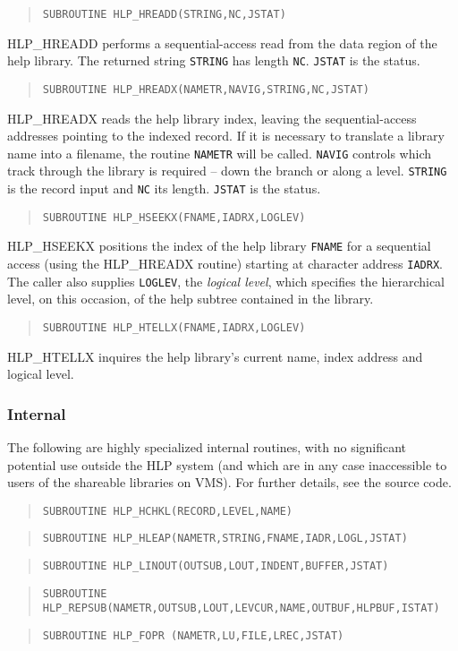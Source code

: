 \begin{verse}
{\tt SUBROUTINE HLP\_HREADD(STRING,NC,JSTAT)}
\end{verse}
HLP\_HREADD performs a sequential-access read from the data
region of the help library.  The returned string
{\tt STRING} has length {\tt NC}.  {\tt JSTAT} is the status.

\begin{verse}
{\tt SUBROUTINE HLP\_HREADX(NAMETR,NAVIG,STRING,NC,JSTAT)}
\end{verse}
HLP\_HREADX reads the help library index, leaving
the sequential-access addresses pointing to the indexed record.
If it is necessary to translate a library name into a filename,
the routine {\tt NAMETR} will be called.
{\tt NAVIG} controls which track through the library is
required -- down the branch or along a level.  {\tt STRING} is
the record input and {\tt NC} its length.  {\tt JSTAT} is the
status.

\begin{verse}
{\tt SUBROUTINE HLP\_HSEEKX(FNAME,IADRX,LOGLEV)}
\end{verse}
HLP\_HSEEKX positions the index of the help library {\tt FNAME}
for a sequential
access (using the HLP\_HREADX routine) starting at character address
{\tt IADRX}.  The caller also supplies {\tt LOGLEV},
the {\it logical level}, which specifies the hierarchical level,
on this occasion, of the help subtree contained in the library.

\begin{verse}
{\tt SUBROUTINE HLP\_HTELLX(FNAME,IADRX,LOGLEV)}
\end{verse}
HLP\_HTELLX inquires the help library's current name, index address
and logical level.

\subsubsection{Internal}
The following are highly specialized internal routines, with no
significant potential use outside the HLP system (and which
are in any case
inaccessible to users of the shareable libraries on VMS).
For further details, see the source code.
\begin{verse}
{\tt SUBROUTINE HLP\_HCHKL(RECORD,LEVEL,NAME)}
\end{verse}
\begin{verse}
{\tt SUBROUTINE HLP\_HLEAP(NAMETR,STRING,FNAME,IADR,LOGL,JSTAT)}
\end{verse}
\begin{verse}
{\tt SUBROUTINE HLP\_LINOUT(OUTSUB,LOUT,INDENT,BUFFER,JSTAT)}
\end{verse}
\begin{verse}
{\tt SUBROUTINE HLP\_REPSUB(NAMETR,OUTSUB,LOUT,LEVCUR,NAME,OUTBUF,HLPBUF,ISTAT)}
\end{verse}
\begin{verse}
{\tt SUBROUTINE HLP\_FOPR (NAMETR,LU,FILE,LREC,JSTAT)}
\end{verse}

